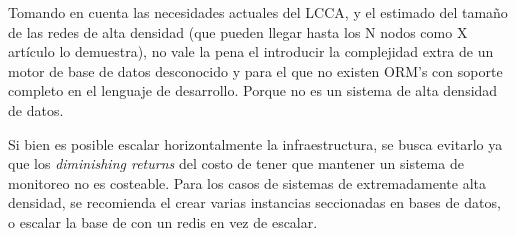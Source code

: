Tomando en cuenta las necesidades actuales del LCCA, y el estimado del tamaño de las redes de alta densidad (que pueden llegar hasta los N nodos como X artículo lo demuestra), no vale la pena el introducir la complejidad extra de un motor de base de datos desconocido y para el que no existen ORM's con soporte completo en el lenguaje de desarrollo. Porque no es un sistema de alta densidad de datos.

Si bien es posible escalar horizontalmente la infraestructura, se busca evitarlo ya que los \textit{diminishing returns} del costo de tener que mantener un sistema de monitoreo no es costeable. Para los casos de sistemas de extremadamente alta densidad, se recomienda el crear varias instancias seccionadas en bases de datos, o escalar la base de con un redis en vez de escalar.




